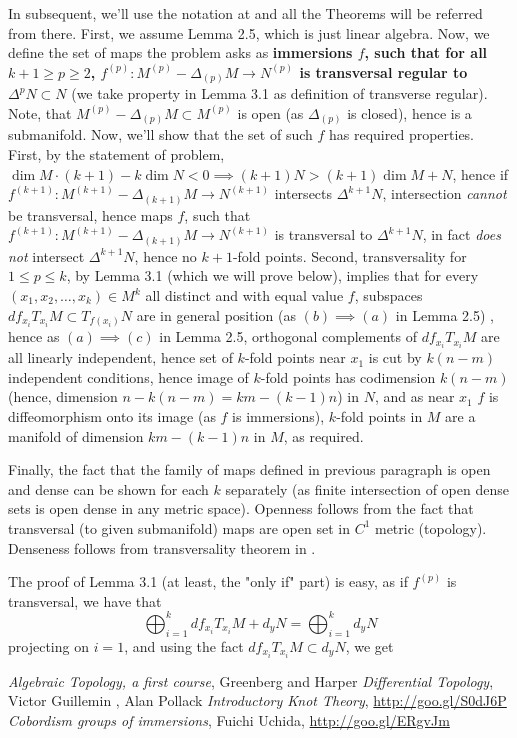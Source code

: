 \documentclass[8pt]{article} %
\begin{document}
\begin{enumerate}[label=\bfseries \arabic*.]
		In subsequent, we'll use the notation at \cite[p. 209]{uchida} and all the Theorems will be referred from there. First, we
		assume Lemma 2.5, which is just linear algebra. Now, we define the set of maps the problem asks as {\bf immersions $f$, such that
		for all $k+1\geq
		p\geq 2$, $f^{(p)}:M^{(p)}-\Delta_{(p)}M\to N^{(p)}$ is transversal regular to $\Delta^p N\subset N$} (we take property in
		Lemma 3.1 as definition of transverse regular). Note, that $M^{(p)}-\Delta_{(p)}M\subset M^{(p)}$ is open (as $\Delta_{(p)}$ is 
		closed), hence is a submanifold.
		Now, we'll show that the set of such $f$ has required properties. First,
		by the statement of problem, $\dim M\cdot(k+1)-k\dim N<0\implies (k+1)N>(k+1)\dim M+N$, hence if 
		$f^{(k+1)}:M^{(k+1)}-\Delta_{(k+1)}M\to N^{(k+1)}$ intersects $\Delta^{k+1} N$, intersection {\it cannot} be transversal, hence
		maps $f$, such that $f^{(k+1)}:M^{(k+1)}-\Delta_{(k+1)}M\to N^{(k+1)}$ is transversal to $\Delta^{k+1} N$, in fact {\it does not}
		intersect $\Delta^{k+1} N$, hence no $k+1$-fold points. 
		Second, transversality for $1\leq p\leq k$, by Lemma 3.1 (which we will prove below), implies that
		for every $(x_1,x_2,\hdots,x_k)\in M^k$ all distinct and with equal value $f$, subspaces $df_{x_i}T_{x_i}M\subset T_{f(x_i)}N$
		are in general position (as $(b)\implies(a)$ in Lemma 2.5)
		, hence as $(a)\implies(c)$ in Lemma 2.5, orthogonal complements of $df_{x_i}T_{x_i}M$ are all linearly
		independent, hence set of $k$-fold points near $x_1$ is cut by $k(n-m)$ independent conditions, hence image of $k$-fold points
		has codimension $k(n-m)$ (hence, dimension $n-k(n-m)=km-(k-1)n$)
		in $N$, and as near $x_1$ $f$ is diffeomorphism onto its image (as $f$ is immersions), $k$-fold points in $M$ are
		a manifold of dimension $km-(k-1)n$ in $M$, as required.

		Finally, the fact that the family of maps defined in previous paragraph is open and dense can be shown for each $k$ separately
		(as finite intersection of open dense sets is open dense in any metric space). Openness follows from the fact that transversal
		(to given submanifold) maps are open set in $C^1$ metric (topology). Denseness follows from transversality theorem in \cite{gp}.

		The proof of Lemma 3.1 (at least, the "only if" part) is easy, as if $f^{(p)}$ is transversal, we have that
		\[\bigoplus_{i=1}^k df_{x_i}T_{x_i}M+d_yN=\bigoplus_{i=1}^k d_yN\]
		projecting on $i=1$, and using the fact $df_{x_i}T_{x_i}M\subset d_yN$, we get
\end{enumerate}
\begin{thebibliography}{9}
	 {\em Algebraic Topology, a first course}, Greenberg and Harper
	 {\em Differential Topology}, Victor Guillemin , Alan Pollack
	 {\em Introductory Knot Theory}, \url{http://goo.gl/S0dJ6P}
	 {\em Cobordism groups of immersions}, Fuichi Uchida, \url{http://goo.gl/ERgvJm}
\end{thebibliography}
\end{document}
